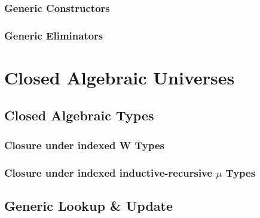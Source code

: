 \documentclass[12pt]{report}
\theoremstyle{definition}
\theoremstyle{remark}
\numberwithin{definition}{section}
\numberwithin{equation}{section}
\numberwithin{proposition}{section}
\numberwithin{conjecture}{section}
\numberwithin{theorem}{section}
\numberwithin{lemma}{section}
\numberwithin{corollary}{section}
\numberwithin{example}{section}
\numberwithin{remark}{section}
\begin{document}
\section{Generic Constructors}
\section{Generic Eliminators}





\part{Closed Algebraic Universes}\label{part:closed}




\chapter{Closed Algebraic Types}\label{ch:closed}
\section{Closure under indexed W Types}
\section{Closure under indexed inductive-recursive $\mu$ Types}

\chapter{Generic Lookup \& Update}\label{ch:gupdate}
\end{document}

